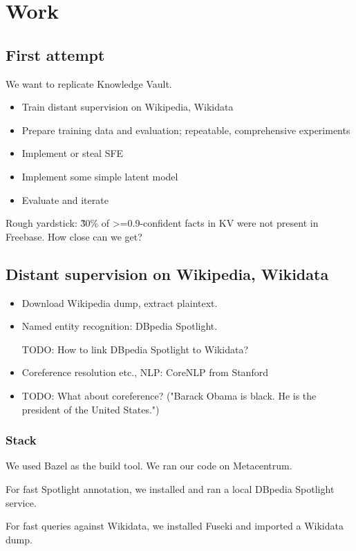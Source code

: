 \chapter{Work}

\section{First attempt}

We want to replicate Knowledge Vault.
\begin{itemize}
\item Train distant supervision on Wikipedia, Wikidata
\item Prepare training data and evaluation; repeatable, comprehensive
experiments
\item Implement or steal SFE
\item Implement some simple latent model
\item Evaluate and iterate
\end{itemize}
Rough yardstick: \~30\% of >=0.9-confident facts in KV were not present in
Freebase. How close can we get?

\section{Distant supervision on Wikipedia, Wikidata}

\begin{itemize}
\item Download Wikipedia dump, extract plaintext.
\item Named entity recognition: DBpedia Spotlight\cite{dbpedia-spotlight}.

	TODO: How to link DBpedia Spotlight to Wikidata?

\item Coreference resolution etc., NLP: CoreNLP from Stanford\cite{stanford-corenlp}

\item TODO: What about coreference? ("Barack Obama is black. He is the
president of the United States.")
\end{itemize}

\subsection{Stack}

We used Bazel as the build tool. We ran our code on Metacentrum.

For fast Spotlight annotation, we installed and ran a local DBpedia Spotlight
service\cite{dbpedia-spotlight}.

For fast queries against Wikidata, we installed Fuseki and imported a Wikidata
dump.
